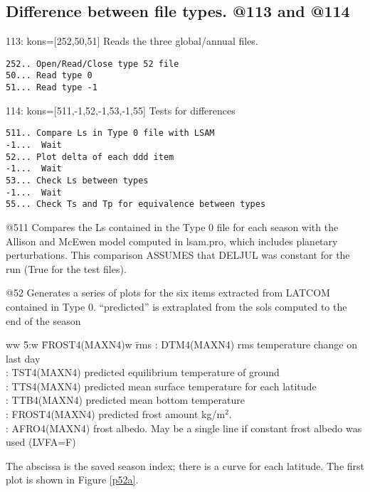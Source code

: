 \documentclass{article}  %
\begin{document}
\subsection{Difference between file types. @113 and @114 } %
 
113: kons=[252,50,51] Reads the three global/annual files. 
\vspace{-3.mm} 
\begin{verbatim}
252.. Open/Read/Close type 52 file
50... Read type 0
51... Read type -1
\end{verbatim}

114: kons=[511,-1,52,-1,53,-1,55] Tests for differences 
\vspace{-3.mm} 
\begin{verbatim}
511.. Compare Ls in Type 0 file with LSAM 
-1...  Wait
52... Plot delta of each ddd item
-1...  Wait
53... Check Ls between types
-1...  Wait
55... Check Ts and Tp for equivalence between types
\end{verbatim}

@511 Compares the Ls contained in the Type 0 file for each season with the
Allison and McEwen model computed in lsam.pro, which includes planetary
perturbations. This comparison ASSUMES that DELJUL was constant for the run
(True for the test files).

@52 Generates a series of plots for the six items extracted from LATCOM
contained in Type 0. ``predicted'' is extraplated from the sols computed to the
end of the season
\vspace{-3.mm} \begin{tabbing}
ww \= 5:w \= FROST4(MAXN4)w \= rms \kill
 : \> DTM4(MAXN4)   \> rms temperature change on last day \\
 : \> TST4(MAXN4)   \> predicted equilibrium temperature of ground \\
 : \> TTS4(MAXN4)   \> predicted mean surface temperature for each latitude \\
 : \> TTB4(MAXN4)   \> predicted mean bottom temperature \\
 : \> FROST4(MAXN4) \> predicted frost amount kg/m$^2$. \\
 : \>  AFRO4(MAXN4)  \> frost albedo. May be a single line if constant frost albedo was used (LVFA=F) \\
\end{tabbing}  \vspace{-3.mm}
The abscissa is the saved season index; there is a curve for each latitude. The first plot is shown in Figure \ref{p52a}.
 
\end{document}
